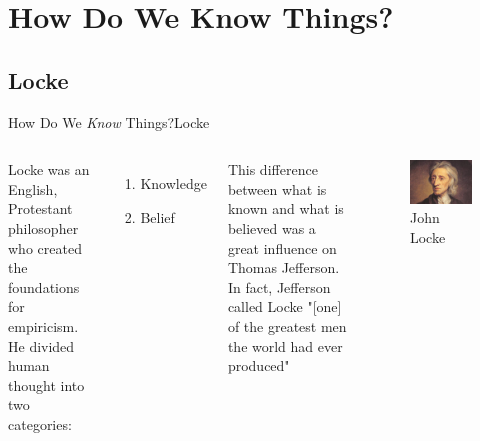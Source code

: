 \section{How Do We Know Things?}
\subsection{Locke}
\begin{frame}{How Do We \textit{Know} Things?}{Locke}

	\begin{columns}[T]
		Locke was an English, Protestant philosopher who created the foundations for empiricism. He divided human thought into two categories:
		\begin{enumerate}
			\item Knowledge
			\item Belief
		\end{enumerate}
		This difference between what is known and what is believed was a great influence on Thomas Jefferson. In fact, Jefferson called Locke "[one] of the greatest men the world had ever produced"
		\begin{figure}
			\centering
			\includegraphics[width=\textwidth]{images/locke.jpg}
			\caption{John Locke}
		\end{figure}
	\end{columns}

 \end{frame}


